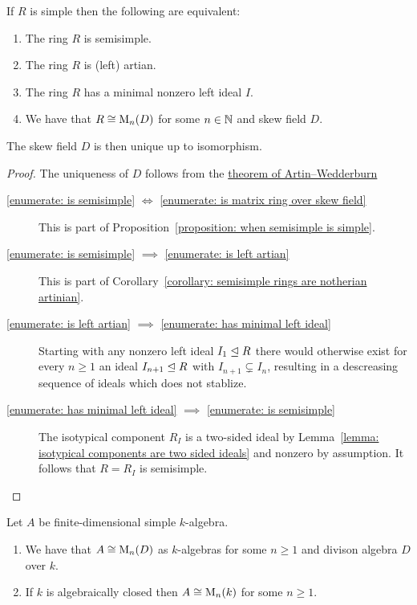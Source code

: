 \begin{theorem}[Wedderburn]
  \label{theorem: wedderburns theorem}
  If $R$ is simple then the following are equivalent:
  \begin{enumerate}
    \item
      \label{enumerate: is semisimple}
      The ring $R$ is semisimple.
    \item 
      \label{enumerate: is left artian}
      The ring $R$ is (left) artian.
    \item
      \label{enumerate: has minimal left ideal}
      The ring $R$ has a minimal nonzero left ideal $I$.
    \item
      \label{enumerate: is matrix ring over skew field}
      We have that $R \cong \operatorname{M}_n(D)$ for some $n \in \mathbb{N}$ and skew field $D$.
  \end{enumerate}
  The skew field $D$ is then unique up to isomorphism.
\end{theorem}


\begin{proof}
  The uniqueness of $D$ follows from the \hyperref[theorem: artin wedderburn theorem]{theorem of Artin--Wedderburn}
  \begin{description}
    \item[\ref*{enumerate: is semisimple} $\iff$ \ref*{enumerate: is matrix ring over skew field}]
      This is part of Proposition~\ref{proposition: when semisimple is simple}.
    \item[\ref*{enumerate: is semisimple} $\implies$ \ref*{enumerate: is left artian}]
      This is part of Corollary~\ref{corollary: semisimple rings are notherian artinian}.
    \item[\ref*{enumerate: is left artian} $\implies$ \ref*{enumerate: has minimal left ideal}]
      Starting with any nonzero left ideal $I_1 \trianglelefteq R$ there would otherwise exist for every $n \geq 1$ an ideal $I_{n+1} \trianglelefteq R$ with $I_{n+1} \subsetneq I_n$, resulting in a descreasing sequence of ideals which does not stablize.
    \item[\ref*{enumerate: has minimal left ideal} $\implies$ \ref*{enumerate: is semisimple}]
      The isotypical component $R_I$ is a two-sided ideal by Lemma~\ref{lemma: isotypical components are two sided ideals} and nonzero by assumption.
      It follows that $R = R_I$ is semisimple.
    \qedhere
  \end{description}
\end{proof}


\begin{corollary}
  \label{corollary: wedderburn for algebras}
  Let $A$ be finite-dimensional simple $k$-algebra.
  \begin{enumerate}
    \item
      We have that $A \cong \operatorname{M}_n(D)$ as $k$-algebras for some $n \geq 1$ and divison algebra $D$ over $k$.
    \item
      If $k$ is algebraically closed then $A \cong \operatorname{M}_n(k)$ for some $n \geq 1$.
  \end{enumerate}
\end{corollary}


